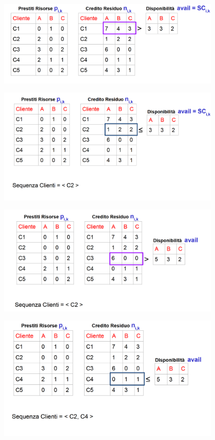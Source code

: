\begin{figure} [h]
    \centering
    \includegraphics[width=0.65\linewidth]{Images/Screenshot 2025-01-15 122853.png}
\end{figure}

\begin{figure} [h]
    \centering
    \includegraphics[width=0.65\linewidth]{Images/Screenshot 2025-01-15 123110.png}
\end{figure}

\begin{figure} [h]
    \centering
    \includegraphics[width=0.65\linewidth]{Images/Screenshot 2025-01-15 125005.png}
\end{figure}

\begin{figure} [h]
    \centering
    \includegraphics[width=0.65\linewidth]{Images/Screenshot 2025-01-15 125124.png}
\end{figure}

